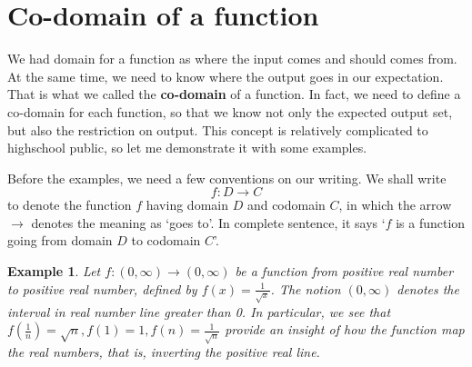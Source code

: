 \documentclass[12pt]{article}
\newtheorem*{example}{Example}
\begin{document}
    \section*{Co-domain of a function}
    We had domain for a function as where the input comes and should comes from. At the same time, we need to know where the output goes in our expectation. That is what we called the \textbf{co-domain} of a function. In fact, we need to define a co-domain for each function, so that we know not only the expected output set, but also the restriction on output. This concept is relatively complicated to highschool public, so let me demonstrate it with some examples.

    Before the examples, we need a few conventions on our writing. We shall write $$f:D\to C$$ to denote the function $f$ having domain $D$ and codomain $C$, in which the arrow $\to$ denotes the meaning as `goes to'. In complete sentence, it says `$f$ is a function going from domain $D$ to codomain $C$'.

    \begin{example}
        Let $f:(0,\infty)\to(0,\infty)$ be a function from positive real number to positive real number, defined by $f(x)=\frac{1}{\sqrt{x}}$. The notion $(0,\infty)$ denotes the interval in real number line greater than 0. In particular, we see that $f(\frac{1}{n})=\sqrt{n},f(1)=1,f(n)=\frac{1}{\sqrt{n}}$ provide an insight of how the function map the real numbers, that is, inverting the positive real line.
    \end{example}
\end{document}

